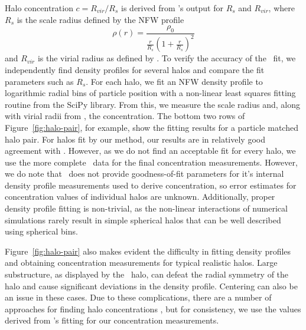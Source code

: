 Halo concentration $c=R_{vir}/R_{s}$ is derived from \rockstar's output for $R_{s}$ and $R_{vir}$, where $R_{s}$ is the scale radius defined by the NFW \citep{1996ApJ...462..563N} profile
\begin{equation} \label{eq:nfw_profile}
	\rho(r) = \frac{ \rho_{0} }{ \frac{ r }{ R_{s}} \left( 1 + \frac{r}{R_{s}} \right)^{2} }
\end{equation}
and $R_{vir}$ is the virial radius as defined by \citet{1998ApJ...495...80B}.  To verify the accuracy of the \rockstar\ fit, we independently find density profiles for several halos and compare the fit parameters such as $R_{s}$.  For each halo, we fit an NFW density profile to logarithmic radial bins of particle position with a non-linear least squares fitting routine from the SciPy library.  From this, we measure the scale radius and, along with virial radii from \rockstar, the concentration.  The bottom two rows of Figure~\ref{fig:halo-pair}, for example, show the fitting results for a particle matched halo pair.  For halos fit by our method, our results are in relatively good agreement with \rockstar.  However, as we do not find an acceptable fit for every halo, we use the more complete \rockstar\ data for the final concentration measurements.  However, we do note that \rockstar\ does not provide goodness-of-fit parameters for it's internal density profile measurements used to derive concentration, so error estimates for concentration values of individual halos are unknown.  Additionally, proper density profile fitting is non-trivial, as the non-linear interactions of numerical simulations rarely result in simple spherical halos that can be well described using spherical bins.

Figure~\ref{fig:halo-pair} also makes evident the difficulty in fitting density profiles and obtaining concentration measurements for typical realistic halos.  Large substructure, as displayed by the \za\ halo, can defeat the radial symmetry of the halo and cause significant deviations in the density profile.  Centering can also be an issue in these cases.  Due to these complications, there are a number of approaches for finding halo concentrations \citep{2012MNRAS.423.3018P}, but for consistency, we use the values derived from \rockstar's fitting for our concentration measurements.




